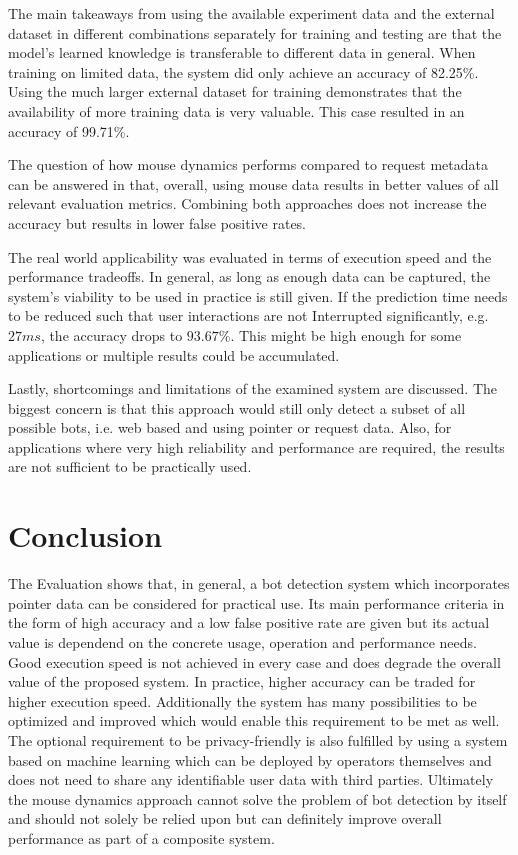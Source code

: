 \documentclass[
    fontsize=12pt,
    headings=small,
    parskip=half,           %
    bibliography=totoc,
    numbers=noenddot,       %
    open=any,               %
    final,                   %
    table
]{scrreprt}
\begin{document}
The main takeaways from using the available experiment data and the external dataset in different combinations separately for training and testing are that the model's learned knowledge is transferable to different data in general. When training on limited data, the system did only achieve an accuracy of 82.25\%. Using the much larger external dataset for training demonstrates that the availability of more training data is very valuable. This case resulted in an accuracy of 99.71\%.

The question of how mouse dynamics performs compared to request metadata can be answered in that, overall, using mouse data results in better values of all relevant evaluation metrics. Combining both approaches does not increase the accuracy but results in lower false positive rates.

The real world applicability was evaluated in terms of execution speed and the performance tradeoffs. In general, as long as enough data can be captured, the system's viability to be used in practice is still given. If the prediction time needs to be reduced such that user interactions are not Interrupted significantly, e.g. $27ms$, the accuracy drops to $93.67\%$. This might be high enough for some applications or multiple results could be accumulated.

Lastly, shortcomings and limitations of the examined system are discussed. The biggest concern is that this approach would still only detect a subset of all possible bots, i.e. web based and using pointer or request data. Also, for applications where very high reliability and performance are required, the results are not sufficient to be practically used.

\label{sec:conclusion}
\chapter{Conclusion}

The Evaluation shows that, in general, a bot detection system which incorporates pointer data can be considered for practical use. Its main performance criteria in the form of high accuracy and a low false positive rate are given but its actual value is dependend on the concrete usage, operation and performance needs. Good execution speed is not achieved in every case and does degrade the overall value of the proposed system. In practice, higher accuracy can be traded for higher execution speed. Additionally the system has many possibilities to be optimized and improved which would enable this requirement to be met as well. The optional requirement to be privacy-friendly is also fulfilled by using a system based on machine learning which can be deployed by operators themselves and does not need to share any identifiable user data with third parties. Ultimately the mouse dynamics approach cannot solve the problem of bot detection by itself and should not solely be relied upon but can definitely improve overall performance as part of a composite system.
\end{document}
